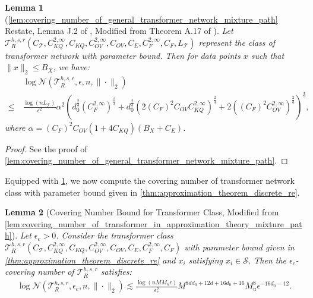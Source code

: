 \documentclass[12pt]{article}
\numberwithin{equation}{section}
\let\cite\citep
\theoremstyle{theoremstyle}
\newtheorem{lemma}{Lemma}[section]
\numberwithin{equation}{section}
\numberwithin{theorem}{section}
\numberwithin{proposition}{section}
\numberwithin{definition}{section}
\numberwithin{lemma}{section}
\numberwithin{assumption}{section}
\numberwithin{remark}{section}
\begin{document}
\begin{lemma}[\cref{lem:covering_number_of_general_transformer_network_mixture_path} Restate, Lemma J.2 of \cite{hu2024statistical}, Modified from Theorem A.17 of \cite{edelman2022inductivebiasesvariablecreation}]\label{lem:covering_number_of_general_transformer_network}
Let $\mathcal{T}^{h,s,r}_R(C_\mathcal{T},C^{2,\infty}_{KQ},C_{KQ},C^{2,\infty}_{OV},C_{OV},C_{E},C^{2,\infty}_{F},C_{F},L_\mathcal{T})$ represent the class of transformer network with parameter bound.
Then for data points $x$ such that $\|x\|_2\leq B_X$, we have:
\begin{align*}
    & ~ \log\mathcal{N}(\mathcal{T}^{h,s,r}_R,\epsilon,n,\|\cdot\|_2) \\
    \leq & ~
    \frac{\log(nL_\mathcal{T})}{\epsilon^2}\alpha^2(d_0^\frac{2}{3}(C_F^{2,\infty})^\frac{2}{3}+d_0^\frac{2}{3}(2(C_F)^2C_{OV}C_{KQ}^{2,\infty})^\frac{2}{3}+2((C_F)^2C_{OV}^{2,\infty})^\frac{2}{3})^3,
\end{align*}
where $\alpha=(C_F)^2C_{OV}(1+4C_{KQ})(B_X+C_E)$.
\end{lemma}

\begin{proof}
    See the proof of \cref{lem:covering_number_of_general_transformer_network_mixture_path}.
\end{proof}


Equipped with \cref{lem:covering_number_of_general_transformer_network}, we now compute the covering number of transformer network class with parameter bound given in \cref{thm:approximation_theorem_discrete_re}.

\begin{lemma}[Covering Number Bound for Transformer Class, Modified from \cref{lem:covering_number_of_transformer_in_approximation_theory_mixture_path}]\label{lem:covering_number_of_transformer_in_approximation_theory}
Let $\epsilon_c>0$. 
Consider the transformer class $\mathcal{T}^{h,s,r}_R(C_\mathcal{T},C^{2,\infty}_{KQ},C_{KQ},C^{2,\infty}_{OV},C_{OV},C_{E},C^{2,\infty}_{F},C_{F})$ with parameter bound given in \cref{thm:approximation_theorem_discrete_re} and $x_i$ satisfying $x_i\in \mathcal{S}$.
Then the $\epsilon_c$-covering number of $\mathcal{T}^{h,s,r}_R$ satisfies:
\begin{align*}
    \log\mathcal{N}(\mathcal{T}^{h,s,r}_R,\epsilon_c,n,\|\cdot\|_2)\lesssim
    \frac{\log(nMM_u\epsilon)}{\epsilon_c^2}M^{8dd_0+12d+16d_0+16}M_u^8\epsilon^{-16d_0-12}.
\end{align*}
\end{lemma}
\end{document}
